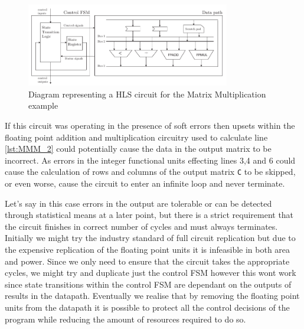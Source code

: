 \begin{figure}[!t]
\centering
\includegraphics[width=3.5in]{./imgs/singleHLSArch.pdf}
\caption{Diagram representing a HLS circuit for the Matrix Multiplication example}
\label{fig:singleHLSArch}
\vspace{-9mm}
\end{figure}

If this circuit was operating in the presence of soft errors then upsets within
the floating point addition and multiplication circuitry used to calculate line \ref{lst:MMM_2} could potentially cause the data in the output
matrix to be incorrect.
As errors in the integer functional units effecting lines 3,4 and 6
could cause the calculation of rows and columns of the output matrix \lstinline$C$ to be skipped, or even
worse, cause the circuit to enter an infinite loop and never terminate.

Let's say in this case errors in
the output are tolerable or can be detected through statistical means at a later point, but
there is a strict requirement that the circuit finishes in correct number of cycles and must
always terminates.
Initially we might try the industry standard of full circuit replication
but due to the expensive replication of the floating point units it is infeasible in both area and power.
Since we only need to ensure that the circuit takes the appropriate cycles,
we might try and duplicate just the control FSM however this wont work since state transitions
within the control FSM are dependant on the outputs of results in the datapath.
Eventually we realise that by removing the floating point units from the datapath
it is  possible to protect all the control decisions of the program while reducing the amount of resources required
to do so.

